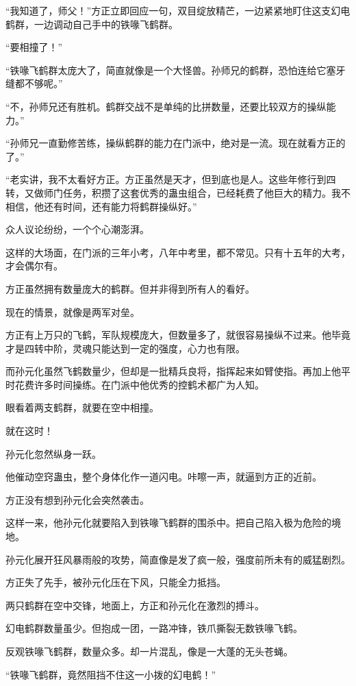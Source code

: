 \begin{this_body}
“我知道了，师父！”方正立即回应一句，双目绽放精芒，一边紧紧地盯住这支幻电鹤群，一边调动自己手中的铁喙飞鹤群。

“要相撞了！”

“铁喙飞鹤群太庞大了，简直就像是一个大怪兽。孙师兄的鹤群，恐怕连给它塞牙缝都不够呢。”

“不，孙师兄还有胜机。鹤群交战不是单纯的比拼数量，还要比较双方的操纵能力。”

“孙师兄一直勤修苦练，操纵鹤群的能力在门派中，绝对是一流。现在就看方正的了。”

“老实讲，我不太看好方正。方正虽然是天才，但到底也是人。这些年修行到四转，又做师门任务，积攒了这套优秀的蛊虫组合，已经耗费了他巨大的精力。我不相信，他还有时间，还有能力将鹤群操纵好。”

众人议论纷纷，一个个心潮澎湃。

这样的大场面，在门派的三年小考，八年中考里，都不常见。只有十五年的大考，才会偶尔有。

方正虽然拥有数量庞大的鹤群。但并非得到所有人的看好。

现在的情景，就像是两军对垒。

方正有上万只的飞鹤，军队规模庞大，但数量多了，就很容易操纵不过来。他毕竟才是四转中阶，灵魂只能达到一定的强度，心力也有限。

而孙元化虽然飞鹤数量少，但却是一批精兵良将，指挥起来如臂使指。再加上他平时花费许多时间操练。在门派中他优秀的控鹤术都广为人知。

眼看着两支鹤群，就要在空中相撞。

就在这时！

孙元化忽然纵身一跃。

他催动空窍蛊虫，整个身体化作一道闪电。咔嚓一声，就逼到方正的近前。

方正没有想到孙元化会突然袭击。

这样一来，他孙元化就要陷入到铁喙飞鹤群的围杀中。把自己陷入极为危险的境地。

孙元化展开狂风暴雨般的攻势，简直像是发了疯一般，强度前所未有的威猛剧烈。

方正失了先手，被孙元化压在下风，只能全力抵挡。

两只鹤群在空中交锋，地面上，方正和孙元化在激烈的搏斗。

幻电鹤群数量虽少。但抱成一团，一路冲锋，铁爪撕裂无数铁喙飞鹤。

反观铁喙飞鹤群，数量众多。却一片混乱，像是一大蓬的无头苍蝇。

“铁喙飞鹤群，竟然阻挡不住这一小拨的幻电鹤！”


\end{this_body}
